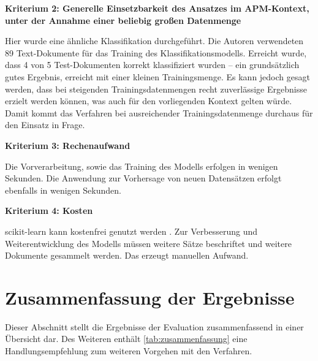 {\bf Kriterium 2: Generelle Einsetzbarkeit des Ansatzes im APM-Kontext, unter der Annahme einer beliebig großen Datenmenge}

Hier \cite{Vogelsang} wurde eine ähnliche Klassifikation durchgeführt. Die Autoren verwendeten 89 Text-Dokumente für das Training des Klassifikationsmodells. Erreicht wurde, dass 4 von 5 Test-Dokumenten korrekt klassifiziert wurden – ein grundsätzlich gutes Ergebnis, erreicht mit einer kleinen Trainingsmenge. Es kann jedoch gesagt werden, dass bei steigenden Trainingsdatenmengen recht zuverlässige Ergebnisse erzielt werden können, was auch für den vorliegenden Kontext gelten würde. Damit kommt das Verfahren bei ausreichender Trainingsdatenmenge durchaus für den Einsatz in Frage. 

{\bf Kriterium 3: Rechenaufwand}

Die Vorverarbeitung, sowie das Training des Modells erfolgen in wenigen Sekunden. Die Anwendung zur Vorhersage von neuen Datensätzen erfolgt ebenfalls in wenigen Sekunden.

{\bf Kriterium 4: Kosten}

scikit-learn kann kostenfrei genutzt werden \cite{scikit-license}. Zur Verbesserung und Weiterentwicklung des Modells müssen weitere Sätze beschriftet und weitere Dokumente gesammelt werden. Das erzeugt manuellen Aufwand.

\section{Zusammenfassung der Ergebnisse}

Dieser Abschnitt stellt die Ergebnisse der Evaluation zusammenfassend in einer Übersicht dar. Des Weiteren enthält \ref{tab:zusammenfassung} eine Handlungsempfehlung zum weiteren Vorgehen mit den Verfahren.


